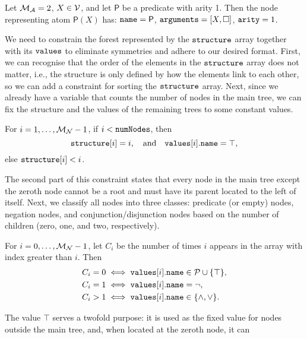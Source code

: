 \begin{example}
  Let $\mathcal{M}_{\mathcal{A}}{} = 2$, $X \in \mathcal{V}{}$, and let $\mathsf{P}$ be a
  predicate with arity 1. Then the node representing atom $\mathsf{P}(X)$ has:
    $\texttt{\textup{name}} = \mathsf{P}$, $\texttt{\textup{arguments}} = [X, \Box]$,
    $\texttt{\textup{arity}} = 1$.
\end{example}

We need to constrain the forest represented by the $\texttt{\textup{structure}}$
array together with its $\texttt{\textup{values}}$ to eliminate symmetries and adhere
to our desired format. First, we can recognise that the order of the elements in
the $\texttt{\textup{structure}}$ array does not matter, i.e., the structure is only
defined by how the elements link to each other, so we can add a constraint for
sorting the $\texttt{\textup{structure}}$ array. Next, since we already have a
variable that counts the number of nodes in the main tree, we can fix the
structure and the values of the remaining trees to some constant values.
\begin{constraint}
  For $i = 1, \dots, \mathcal{M}_{\mathcal{N}}{} - 1$, if $i < \texttt{\textup{numNodes}}$, then
  \[
    \texttt{\textup{structure}}[i] = i, \quad \text{and} \quad
    \texttt{\textup{values}}[i].\texttt{\textup{name}} = \top,
  \]
  else $\texttt{\textup{structure}}[i] < i$.
\end{constraint}
The second part of this constraint states that every node in the main tree
except the zeroth node cannot be a root and must have its parent located to
the left of itself. Next, we classify all nodes into three classes: predicate
(or empty) nodes, negation nodes, and conjunction/disjunction nodes based on the
number of children (zero, one, and two, respectively).
\begin{constraint} \label{constraint:node_types}
  For $i = 0, \dots, \mathcal{M}_{\mathcal{N}}{} - 1$, let $C_i$ be the number of times $i$
  appears in the  array with index greater than $i$. Then
  \begin{align*}
    C_i = 0 &\iff \texttt{\textup{values}}[i].\texttt{\textup{name}} \in \mathcal{P}{} \cup \{ \top \},\\
    C_i = 1 &\iff \texttt{\textup{values}}[i].\texttt{\textup{name}} = \neg,\\
    C_i > 1 &\iff \texttt{\textup{values}}[i].\texttt{\textup{name}} \in \{ \land, \lor \}.
  \end{align*}
\end{constraint}
The value $\top$ serves a twofold purpose: it is used as the fixed value for
nodes outside the main tree, and, when located at the zeroth node, it can
